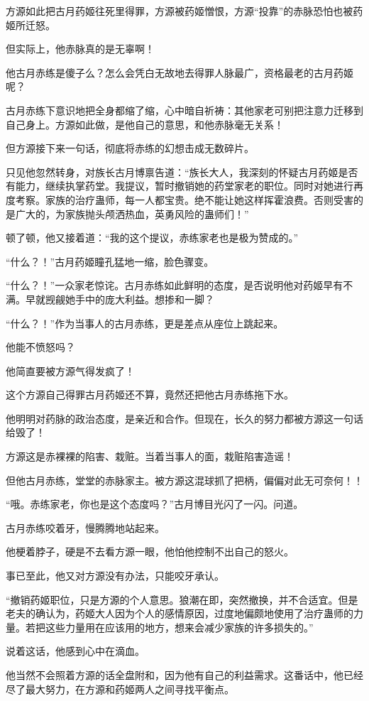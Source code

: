 \begin{this_body}
方源如此把古月药姬往死里得罪，方源被药姬憎恨，方源“投靠”的赤脉恐怕也被药姬所迁怒。

但实际上，他赤脉真的是无辜啊！

他古月赤练是傻子么？怎么会凭白无故地去得罪人脉最广，资格最老的古月药姬呢？

古月赤练下意识地把全身都缩了缩，心中暗自祈祷：其他家老可别把注意力迁移到自己身上。方源如此做，是他自己的意思，和他赤脉毫无关系！

但方源接下来一句话，彻底将赤练的幻想击成无数碎片。

只见他忽然转身，对族长古月博禀告道：“族长大人，我深刻的怀疑古月药姬是否有能力，继续执掌药堂。我提议，暂时撤销她的药堂家老的职位。同时对她进行再度考察。家族的治疗蛊师，每一人都宝贵。绝不能让她这样挥霍浪费。否则受害的是广大的，为家族抛头颅洒热血，英勇风险的蛊师们！”

顿了顿，他又接着道：“我的这个提议，赤练家老也是极为赞成的。”

“什么？！”古月药姬瞳孔猛地一缩，脸色骤变。

“什么？！”一众家老惊诧。古月赤练如此鲜明的态度，是否说明他对药姬早有不满。早就觊觎她手中的庞大利益。想掺和一脚？

“什么？！”作为当事人的古月赤练，更是差点从座位上跳起来。

他能不愤怒吗？

他简直要被方源气得发疯了！

这个方源自己得罪古月药姬还不算，竟然还把他古月赤练拖下水。

他明明对药脉的政治态度，是亲近和合作。但现在，长久的努力都被方源这一句话给毁了！

方源这是赤裸裸的陷害、栽赃。当着当事人的面，栽赃陷害造谣！

但他古月赤练，堂堂的赤脉家主。被方源这混球抓了把柄，偏偏对此无可奈何！！

“哦。赤练家老，你也是这个态度吗？”古月博目光闪了一闪。问道。

古月赤练咬着牙，慢腾腾地站起来。

他梗着脖子，硬是不去看方源一眼，他怕他控制不出自己的怒火。

事已至此，他又对方源没有办法，只能咬牙承认。

“撤销药姬职位，只是方源的个人意思。狼潮在即，突然撤换，并不合适宜。但是老夫的确认为，药姬大人因为个人的感情原因，过度地偏颇地使用了治疗蛊师的力量。若把这些力量用在应该用的地方，想来会减少家族的许多损失的。”

说着这话，他感到心中在滴血。

他当然不会照着方源的话全盘附和，因为他有自己的利益需求。这番话中，他已经尽了最大努力，在方源和药姬两人之间寻找平衡点。


\end{this_body}
